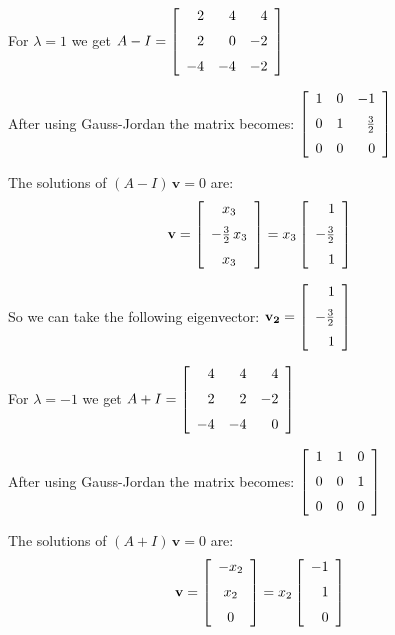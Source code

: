 \documentclass[12pt]{article}
\begin{document}
{For $\lambda=1$ we get
$\displaystyle{
A - I = 
\left [\begin {array}{rrr} 2&4&4\\\noalign{\medskip}2&0&-2
\\\noalign{\medskip}-4&-4&-2\end {array}\right ]
}$

After using Gauss-Jordan the matrix becomes:
$\displaystyle{
\left [\begin {array}{rrr} 1&0&-1\\\noalign{\medskip}0&1&\frac{3}{2}
\\\noalign{\medskip}0&0&0\end {array}\right ]
}$

The solutions of $(A-I)\,\mathbf{v} = 0$ 
are:
\[
\mathbf{v} = 
\left [\begin {array}{c} x_{{3}}\\
\noalign{\medskip}-\frac{3}{2}\,x_{{3}}
\\\noalign{\medskip}x_{{3}}\end {array}\right ]
=
x_3
\left [\begin {array}{r} 1\\\noalign{\medskip}-\frac{3}{2}
\\\noalign{\medskip}1\end {array}\right ]
\]

So we can take the following eigenvector:
$\displaystyle{
\mathbf{v_2} = 
\left [\begin {array}{r} 1\\\noalign{\medskip}-\frac{3}{2}
\\\noalign{\medskip}1\end {array}\right ]
}$


For $\lambda=-1$ we get
$\displaystyle{
A + I = 
\left [\begin {array}{rrr} 4&4&4\\\noalign{\medskip}2&2&-2
\\\noalign{\medskip}-4&-4&0\end {array}\right ]
}$

After using Gauss-Jordan the matrix becomes:
$\displaystyle{
\left [\begin {array}{ccc} 1&1&0\\\noalign{\medskip}0&0&1
\\\noalign{\medskip}0&0&0\end {array}\right ]
}$

The solutions of $(A+I)\,\mathbf{v} = 0$ 
are:
\[
\mathbf{v} = 
\left [\begin {array}{c} -x_{{2}}\\\noalign{\medskip}x_{{2}}
\\\noalign{\medskip}0\end {array}\right ]
=
x_2 \left [\begin {array}{r} -1\\\noalign{\medskip}1
\\\noalign{\medskip}0\end {array}\right ]
\]

}
\end{document}
